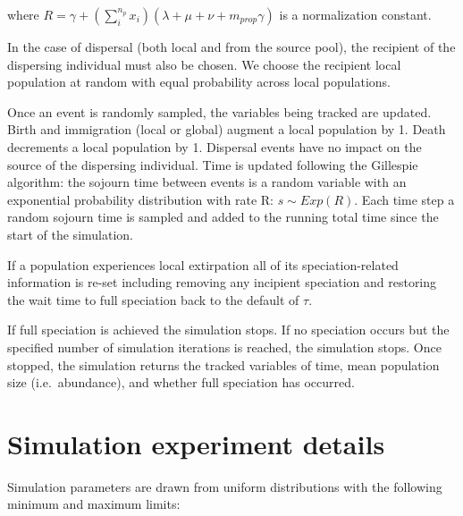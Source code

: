 \documentclass[
  letterpaper,
  DIV=11,
  numbers=noendperiod]{scrartcl}
\begin{document}
where
\(R = \gamma + \left( \sum_i^{n_p} x_i \right) (\lambda + \mu + \nu + m_{prop} \gamma)\)
is a normalization constant.

In the case of dispersal (both local and from the source pool), the
recipient of the dispersing individual must also be chosen. We choose
the recipient local population at random with equal probability across
local populations.

Once an event is randomly sampled, the variables being tracked are
updated. Birth and immigration (local or global) augment a local
population by 1. Death decrements a local population by 1. Dispersal
events have no impact on the source of the dispersing individual. Time
is updated following the Gillespie algorithm: the sojourn time between
events is a random variable with an exponential probability distribution
with rate R: \(s \sim Exp(R)\). Each time step a random sojourn time is
sampled and added to the running total time since the start of the
simulation.

If a population experiences local extirpation all of its
speciation-related information is re-set including removing any
incipient speciation and restoring the wait time to full speciation back
to the default of \(\tau\).

If full speciation is achieved the simulation stops. If no speciation
occurs but the specified number of simulation iterations is reached, the
simulation stops. Once stopped, the simulation returns the tracked
variables of time, mean population size (i.e.~abundance), and whether
full speciation has occurred.

\section{Simulation experiment
details}\label{simulation-experiment-details}

Simulation parameters are drawn from uniform distributions with the
following minimum and maximum limits:
\end{document}
